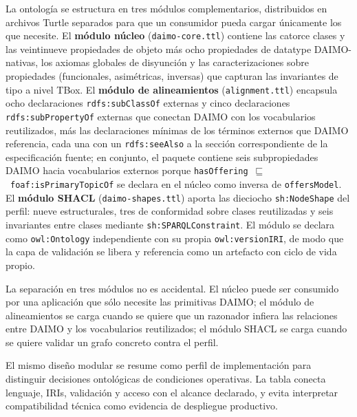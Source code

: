 \documentclass[Afour,sagev,times]{sagej}
\newcommand{\code}[1]{\texttt{#1}}
\begin{document}
La ontología se estructura en tres módulos complementarios, distribuidos en archivos Turtle separados para que un consumidor pueda cargar únicamente los que necesite. El \textbf{módulo núcleo} (\code{daimo-core.ttl}) contiene las catorce clases y las veintinueve propiedades de objeto más ocho propiedades de datatype DAIMO-nativas, los axiomas globales de disyunción y las caracterizaciones sobre propiedades (funcionales, asimétricas, inversas) que capturan las invariantes de tipo a nivel TBox. El \textbf{módulo de alineamientos} (\code{alignment.ttl}) encapsula ocho declaraciones \code{rdfs:subClassOf} externas y cinco declaraciones \code{rdfs:subPropertyOf} externas que conectan DAIMO con los vocabularios reutilizados, más las declaraciones mínimas de los términos externos que DAIMO referencia, cada una con un \code{rdfs:seeAlso} a la sección correspondiente de la especificación fuente; en conjunto, el paquete contiene seis subpropiedades DAIMO hacia vocabularios externos porque \code{hasOffering}~$\sqsubseteq$~\code{foaf:isPrimaryTopicOf} se declara en el núcleo como inversa de \code{offersModel}. El \textbf{módulo SHACL} (\code{daimo-shapes.ttl}) aporta las dieciocho \code{sh:NodeShape} del perfil: nueve estructurales, tres de conformidad sobre clases reutilizadas y seis invariantes entre clases mediante \code{sh:SPARQLConstraint}. El módulo se declara como \code{owl:Ontology} independiente con su propia \code{owl:versionIRI}, de modo que la capa de validación se libera y referencia como un artefacto con ciclo de vida propio.

La separación en tres módulos no es accidental. El núcleo puede ser consumido por una aplicación que sólo necesite las primitivas DAIMO; el módulo de alineamientos se carga cuando se quiere que un razonador infiera las relaciones entre DAIMO y los vocabularios reutilizados; el módulo SHACL se carga cuando se quiere validar un grafo concreto contra el perfil.

El mismo diseño modular se resume como perfil de implementación para distinguir decisiones ontológicas de condiciones operativas. La tabla conecta lenguaje, IRIs, validación y acceso con el alcance declarado, y evita interpretar compatibilidad técnica como evidencia de despliegue productivo.
\end{document}
